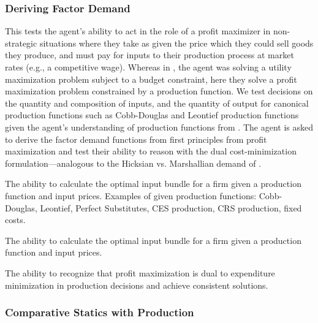 \subsubsection{Deriving Factor Demand}\label{mod:deriving_factor_demand}
This \child tests the agent's ability to act in the role of a profit maximizer in non-strategic situations where they take as given the price which they could sell goods they produce, and must pay for inputs to their production process at market rates (e.g., a competitive wage).  Whereas in , the agent was solving a utility maximization problem subject to a budget constraint, here they solve a profit maximization problem constrained by a production function.  We test decisions on the quantity and composition of inputs, and the quantity of output for canonical production functions such as Cobb-Douglas and Leontief production functions given the agent's understanding of production functions from .  The agent is asked to derive the factor demand functions from first principles from profit maximization and test their ability to reason with the dual cost-minimization formulation---analogous to the Hicksian vs. Marshallian demand of .

\begin{el}\label{el:profit_max}
    {The ability to calculate the optimal input bundle for a firm given a production function and input prices. Examples of given production functions: Cobb-Douglas, Leontief, Perfect Substitutes, CES production, CRS production, fixed costs.}
\end{el}


\begin{el}
    {The ability to calculate the optimal input bundle for a firm given a production function and input prices.}
\end{el}

\begin{el}
    {The ability to recognize that profit maximization is dual to expenditure minimization in production decisions and achieve consistent solutions.}
\end{el}


\subsubsection{Comparative Statics with Production}\label{mod:production_statics}


